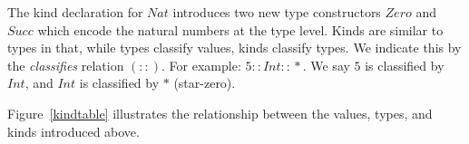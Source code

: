 \documentclass[10pt]{article}
\newcommand{\Conid}[1]{\mathit{#1}}
\newcommand{\Wmega}{\ensuremath{\Omega}mega}
\newcommand{\hide}[1]{}
\begin{document}
The kind declaration for \ensuremath{\Conid{Nat}} introduces two new
type constructors \ensuremath{\Conid{Zero}} and \ensuremath{\Conid{Succ}} which encode the natural
numbers at the type level.
Kinds are similar to types in that, while types classify values, kinds
classify types. We indicate this by the {\em classifies} relation \ensuremath{(\mathbin{::})}. For
example: \ensuremath{\mathrm{5}\mathbin{::}\Conid{Int}\mathbin{::}\mathbin{*}}. We say \ensuremath{\mathrm{5}} is classified by \ensuremath{\Conid{Int}},
and \ensuremath{\Conid{Int}} is classified by \ensuremath{\mathbin{*}} (star-zero). 
\hide{
The kind \ensuremath{\mathbin{*}} classifies all types that classify values (things we actually can
compute). \ensuremath{\mathbin{*}} is classified by \ensuremath{\mathbin{*}\mathrm{1}}, etc. There is an infinite hierarchy of
classifications.  We call this hierarchy the {\em strata}. In fact this
infinite hierarchy is why we chose the name \Wmega. The first few strata are:
values and expressions that are classified by types, types that are
classified by kinds, and kinds that are classified by sorts, etc.}
Figure~\ref{kindtable} illustrates the relationship between the 
values, types, and kinds introduced above.
\end{document}

